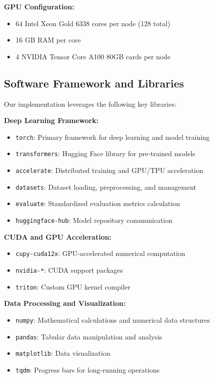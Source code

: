 \documentclass[conference]{IEEEtran}
\begin{document}
\textbf{GPU Configuration:}
\begin{itemize}
\item 64 Intel Xeon Gold 6338 cores per node (128 total)
\item 16 GB RAM per core
\item 4 NVIDIA Tensor Core A100 80GB cards per node
\end{itemize}

\subsection{Software Framework and Libraries}

Our implementation leverages the following key libraries:

\textbf{Deep Learning Framework:}
\begin{itemize}
\item \texttt{torch}: Primary framework for deep learning and model training
\item \texttt{transformers}: Hugging Face library for pre-trained models
\item \texttt{accelerate}: Distributed training and GPU/TPU acceleration
\item \texttt{datasets}: Dataset loading, preprocessing, and management
\item \texttt{evaluate}: Standardized evaluation metrics calculation
\item \texttt{huggingface-hub}: Model repository communication
\end{itemize}

\textbf{CUDA and GPU Acceleration:}
\begin{itemize}
\item \texttt{cupy-cuda12x}: GPU-accelerated numerical computation
\item \texttt{nvidia-*}: CUDA support packages
\item \texttt{triton}: Custom GPU kernel compiler
\end{itemize}

\textbf{Data Processing and Visualization:}
\begin{itemize}
\item \texttt{numpy}: Mathematical calculations and numerical data structures
\item \texttt{pandas}: Tabular data manipulation and analysis
\item \texttt{matplotlib}: Data visualization
\item \texttt{tqdm}: Progress bars for long-running operations
\end{itemize}
\end{document}

